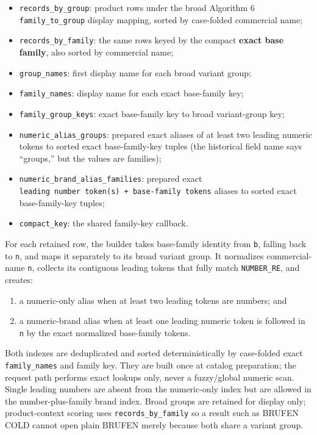 \begin{itemize}
\tightlist
\item
  \texttt{records\_\allowbreak{}by\_\allowbreak{}group}: product rows under the broad Algorithm 6 \texttt{family\_\allowbreak{}to\_\allowbreak{}group} display mapping, sorted by case-folded commercial name;
\item
  \texttt{records\_\allowbreak{}by\_\allowbreak{}family}: the same rows keyed by the compact \textbf{exact base family}, also sorted by commercial name;
\item
  \texttt{group\_\allowbreak{}names}: first display name for each broad variant group;
\item
  \texttt{family\_\allowbreak{}names}: display name for each exact base-family key;
\item
  \texttt{family\_\allowbreak{}group\_\allowbreak{}keys}: exact base-family key to broad variant-group key;
\item
  \texttt{numeric\_\allowbreak{}alias\_\allowbreak{}groups}: prepared exact aliases of at least two leading numeric tokens to sorted exact base-family-key tuples (the historical field name says ``groups,'' but the values are families);
\item
  \texttt{numeric\_\allowbreak{}brand\_\allowbreak{}alias\_\allowbreak{}families}: prepared exact \texttt{leading\ number\ token(s)\ +\ base-family\ tokens} aliases to sorted exact base-family-key tuples;
\item
  \texttt{compact\_\allowbreak{}key}: the shared family-key callback.
\end{itemize}

For each retained row, the builder takes base-family identity from \texttt{b}, falling back to \texttt{n}, and maps it separately to its broad variant group. It normalizes commercial-name \texttt{n}, collects its contiguous leading tokens that fully match \texttt{NUMBER\_\allowbreak{}RE}, and creates:

\begin{enumerate}
\def\labelenumi{\arabic{enumi}.}
\tightlist
\item
  a numeric-only alias when at least two leading tokens are numbers; and
\item
  a numeric-brand alias when at least one leading numeric token is followed in \texttt{n} by the exact normalized base-family tokens.
\end{enumerate}

Both indexes are deduplicated and sorted deterministically by case-folded exact \texttt{family\_\allowbreak{}names} and family key. They are built once at catalog preparation; the request path performs exact lookups only, never a fuzzy/global numeric scan. Single leading numbers are absent from the numeric-only index but are allowed in the number-plus-family brand index. Broad groups are retained for display only; product-context scoring uses \texttt{records\_\allowbreak{}by\_\allowbreak{}family} so a result such as BRUFEN COLD cannot open plain BRUFEN merely because both share a variant group.

